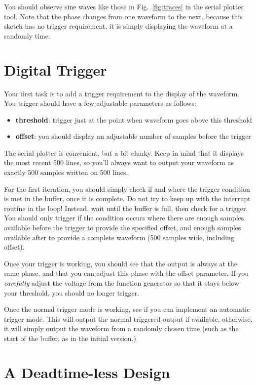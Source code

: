 \documentclass[12pt]{article}
\begin{document}
You should observe sine waves like those in Fig.~\ref{fig:traces} in the serial plotter tool.  Note that the phase changes from one waveform to the next, because this sketch has no trigger requirement, it is simply displaying the waveform at a randomly time.

\section{Digital Trigger}

Your first task is to add a trigger requirement to the display of the waveform.  You trigger should have a few adjustable parameters as follows:
\begin{itemize}
 \item {\bf threshold}:  trigger just at the point when waveform goes above this threshold
 \item {\bf offset}:  you should display an adjustable number of samples before the trigger
\end{itemize}

The serial plotter is convenient, but a bit clunky.  Keep in mind that it displays the most recent 500 lines, so you'll always want to output your waveform as exactly 500 samples written on 500 lines.

For the first iteration, you should simply check if and where the trigger condition is met in the buffer, once it is complete.  Do not try to keep up with the interrupt routine in the loop!  Instead, wait until the buffer is full, then check for a trigger.  You should only trigger if the condition occurs where there are enough samples available before the trigger to provide the specified offset, and enough samples available after to provide a complete waveform (500 samples wide, including offset).

Once your trigger is working, you should see that the output is always at the same phase, and that you can adjust this phase with the offset parameter.  If you {\em carefully} adjust the voltage from the function generator so that it stays below your threshold, you should no longer trigger.

Once the normal trigger mode is working, see if you can implement an automatic trigger mode.  This will output the normal triggered output if available, otherwise, it will simply output the waveform from a randomly chosen time (such as the start of the buffer, as in the initial version.)

\section{A Deadtime-less Design}
\end{document}

